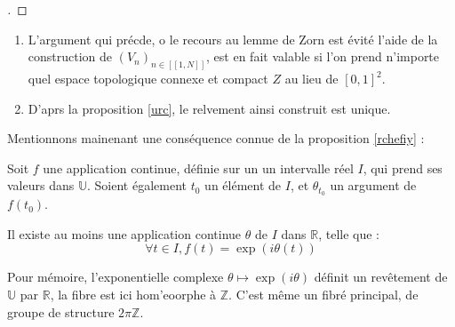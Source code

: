 \begin{proof}[\re]
\end{proof}

\begin{rema}
\begin{enumerate}
\item L'argument qui pr\'ecde, o le recours au lemme de Zorn est \'evit\'e  l'aide de la construction de $(V_n)_{n\in [\![1,N]\!]}$, %
est en fait valable si l'on prend n'importe quel espace topologique connexe et compact $Z$ au lieu de $[0,1]^2$.
\item D'aprs la proposition \ref{urc}, le relvement ainsi construit est unique.
\end{enumerate}
\end{rema}

\bigskip
Mentionnons mainenant une cons\'equence connue de la proposition \ref{rchefiy} :

\begin{prop}
Soit $f$ une application continue, d\'efinie sur un un intervalle r\'eel $I$, qui prend ses valeurs dans $\mathbb{U}$. Soient \'egalement $t_0$ un \'el\'ement de $I$, et $\theta_{t_0}$ un argument de $f(t_0)$.

Il existe au moins une application continue $\theta$ de $I$ dans $\mathbb{R}$, telle que :
\[\forall t \in I, f(t)=\exp (i\theta (t))\]
\end{prop}

Pour m\'emoire, l'exponentielle complexe $\theta \mapsto \exp (i\theta )$ d\'efinit un rev\^etement de $\mathbb{U}$ par $\mathbb{R}$, %
la fibre est ici hom'eoorphe \`a $\mathbb{Z}$. C'est m\^eme un fibr\'e principal, de groupe de structure $2\pi\mathbb{Z}$.


